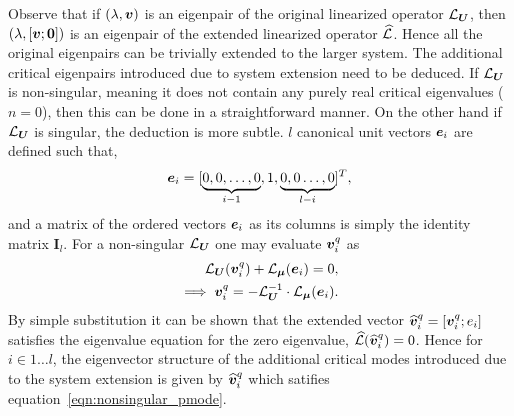 Observe that if $(\lambda, \boldsymbol{v})$ is an eigenpair of the original linearized operator $\mathcal{L}_{\boldsymbol{U}}$, then $(\lambda, [\boldsymbol{v}; \boldsymbol{0}])$ is an eigenpair of the extended linearized operator $\mathcal{\widehat{L}}$. Hence all the original eigenpairs can be trivially extended to the larger system. The additional critical eigenpairs introduced due to system extension need to be deduced. If $\mathcal{L}_{\boldsymbol{U}}$ is non-singular, meaning it does not contain any purely real critical eigenvalues ($n = 0$), then this can be done in a straightforward manner. On the other hand if $\mathcal{L}_{\boldsymbol{U}}$ is singular, the deduction is more subtle. $l$ canonical unit vectors $\boldsymbol{e}_{i}$ are defined such that,
\begin{eqnarray}
	\label{eqn:zeta_i}
	\boldsymbol{e}_{i} = [\underbrace{0,0,\ldots,0}_{i-1},1,\underbrace{0,0\ldots,0}_{l-i}]^{T},
\end{eqnarray}
and a matrix of the ordered vectors $\boldsymbol{e}_{i}$ as its columns is simply the identity matrix $\mathbf{I}_{l}$. For a non-singular $\mathcal{L}_{\boldsymbol{U}}$ one may evaluate $\boldsymbol{v}^{q}_{i}$ as 
\begin{eqnarray}
	\label{eqn:nonsingular_pmode}
	\mathcal{L}_{\boldsymbol{U}}(\boldsymbol{v}^{q}_{i}) + \mathcal{L}_{\boldsymbol{\mu}}(\boldsymbol{e}_{i}) = 0, \\
	\implies \boldsymbol{v}^{q}_{i} = -\mathcal{L}_{\boldsymbol{U}}^{-1}\cdot\mathcal{L}_{\boldsymbol{\mu}}(\boldsymbol{e}_{i}) \nonumber.
\end{eqnarray}
By simple substitution it can be shown that the extended vector ${\widehat{\boldsymbol{v}}}^{q}_{i} = [\boldsymbol{v}^{q}_{i}; e_{i}]$ satisfies the eigenvalue equation for the zero eigenvalue, $\mathcal{\widehat{L}}({\widehat{\boldsymbol{v}}}^{q}_{i}) = 0$. Hence for $i \in 1\ldots l$, the eigenvector structure of the additional critical modes introduced due to the system extension is given by ${\widehat{\boldsymbol{v}}}^{q}_{i}$ which satifies equation~\eqref{eqn:nonsingular_pmode}.

